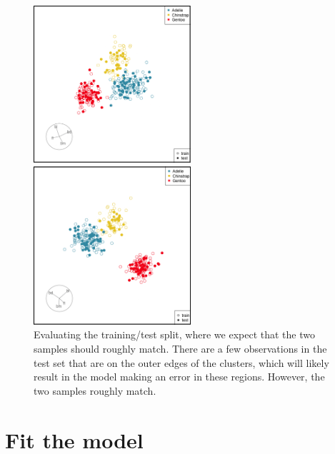 \documentclass[
  letterpaper,
]{krantz}
\begin{document}
\begin{figure}

\begin{minipage}{0.50\linewidth}

\includegraphics[width=2.29167in,height=\textheight,keepaspectratio]{images/p_split.png}

\end{minipage}%
%
\begin{minipage}{0.50\linewidth}

\includegraphics[width=2.29167in,height=\textheight,keepaspectratio]{images/p_split_guided.png}

\end{minipage}%

\caption{\label{fig-p-split-pdf}Evaluating the training/test split,
where we expect that the two samples should roughly match. There are a
few observations in the test set that are on the outer edges of the
clusters, which will likely result in the model making an error in these
regions. However, the two samples roughly match.}

\end{figure}%

\section{Fit the model}\label{fit-the-model}
\end{document}
